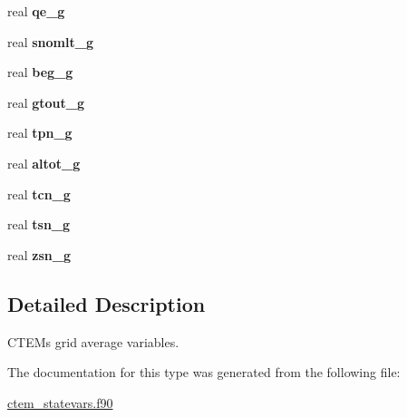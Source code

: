 \begin{DoxyCompactItemize}
\item 
\hypertarget{structctem__statevars_1_1ctem__gridavg_af88a366bb7da6f678ded80206fba2fd1}{}real {\bfseries qe\+\_\+g}\label{structctem__statevars_1_1ctem__gridavg_af88a366bb7da6f678ded80206fba2fd1}

\item 
\hypertarget{structctem__statevars_1_1ctem__gridavg_a5722fe6fb23a98734b3a8c25ac10aafc}{}real {\bfseries snomlt\+\_\+g}\label{structctem__statevars_1_1ctem__gridavg_a5722fe6fb23a98734b3a8c25ac10aafc}

\item 
\hypertarget{structctem__statevars_1_1ctem__gridavg_ab1fb5bfee833809325f7c62918acfd16}{}real {\bfseries beg\+\_\+g}\label{structctem__statevars_1_1ctem__gridavg_ab1fb5bfee833809325f7c62918acfd16}

\item 
\hypertarget{structctem__statevars_1_1ctem__gridavg_a018aedbe6ad91010fe03ec316a86ef75}{}real {\bfseries gtout\+\_\+g}\label{structctem__statevars_1_1ctem__gridavg_a018aedbe6ad91010fe03ec316a86ef75}

\item 
\hypertarget{structctem__statevars_1_1ctem__gridavg_a8d173eeabf5acb17aacc484f639cd8f4}{}real {\bfseries tpn\+\_\+g}\label{structctem__statevars_1_1ctem__gridavg_a8d173eeabf5acb17aacc484f639cd8f4}

\item 
\hypertarget{structctem__statevars_1_1ctem__gridavg_aee958b9598ed4c202f52d945d3273353}{}real {\bfseries altot\+\_\+g}\label{structctem__statevars_1_1ctem__gridavg_aee958b9598ed4c202f52d945d3273353}

\item 
\hypertarget{structctem__statevars_1_1ctem__gridavg_a51bda308630709a2232f78340fc5b700}{}real {\bfseries tcn\+\_\+g}\label{structctem__statevars_1_1ctem__gridavg_a51bda308630709a2232f78340fc5b700}

\item 
\hypertarget{structctem__statevars_1_1ctem__gridavg_ac6981e4178dc0c0615e047bdb027abe4}{}real {\bfseries tsn\+\_\+g}\label{structctem__statevars_1_1ctem__gridavg_ac6981e4178dc0c0615e047bdb027abe4}

\item 
\hypertarget{structctem__statevars_1_1ctem__gridavg_a0cd13fc7fe7754c6c37eb4c7dddce340}{}real {\bfseries zsn\+\_\+g}\label{structctem__statevars_1_1ctem__gridavg_a0cd13fc7fe7754c6c37eb4c7dddce340}

\end{DoxyCompactItemize}


\subsection{Detailed Description}
C\+T\+E\+M\textquotesingle{}s grid average variables. 

The documentation for this type was generated from the following file\+:\begin{DoxyCompactItemize}
\item 
\hyperlink{ctem__statevars_8f90}{ctem\+\_\+statevars.\+f90}\end{DoxyCompactItemize}
